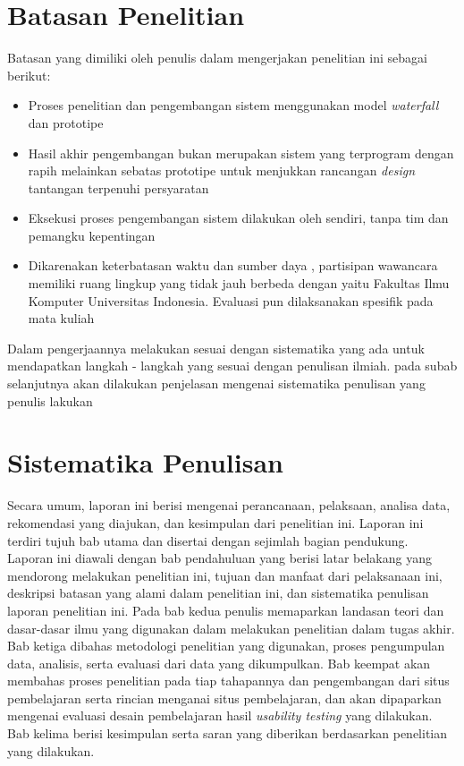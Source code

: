 \section{Batasan Penelitian}
Batasan yang dimiliki oleh penulis dalam mengerjakan penelitian ini sebagai berikut:
\begin{itemize}
	\item Proses penelitian dan pengembangan sistem menggunakan model \textit{waterfall} dan prototipe
	\item Hasil akhir pengembangan bukan merupakan sistem yang terprogram dengan rapih melainkan sebatas prototipe untuk menjukkan rancangan \textit{design} tantangan terpenuhi persyaratan
	\item Eksekusi proses pengembangan sistem dilakukan oleh \saya sendiri, tanpa tim dan pemangku kepentingan
	\item Dikarenakan keterbatasan waktu dan sumber daya \saya, partisipan wawancara memiliki ruang lingkup yang tidak jauh berbeda dengan \saya yaitu Fakultas Ilmu Komputer Universitas Indonesia. Evaluasi pun dilaksanakan spesifik pada mata kuliah \ddp
\end{itemize}
Dalam pengerjaannya \saya melakukan sesuai dengan sistematika yang ada untuk mendapatkan langkah - langkah yang sesuai dengan penulisan ilmiah. pada subab selanjutnya akan dilakukan penjelasan mengenai sistematika penulisan yang penulis lakukan
\section{Sistematika Penulisan}
Secara umum, laporan ini berisi mengenai perancanaan, pelaksaan, analisa data, rekomendasi yang diajukan, dan kesimpulan dari penelitian ini. Laporan ini terdiri tujuh bab utama dan disertai dengan sejimlah bagian pendukung. Laporan ini diawali dengan bab pendahuluan yang berisi latar belakang yang mendorong \saya melakukan penelitian ini, tujuan dan manfaat dari pelaksanaan ini, deskripsi batasan yang \saya alami dalam penelitian ini, dan sistematika penulisan laporan penelitian ini. Pada bab kedua penulis memaparkan landasan teori dan dasar-dasar ilmu yang
digunakan dalam melakukan penelitian dalam tugas akhir. Bab ketiga dibahas
metodologi penelitian yang digunakan, proses pengumpulan data, analisis, serta
evaluasi dari data yang dikumpulkan. Bab keempat akan membahas proses penelitian
pada tiap tahapannya dan pengembangan dari situs pembelajaran serta rincian
menganai situs pembelajaran, dan akan dipaparkan mengenai evaluasi desain pembelajaran hasil \textit{usability testing} yang dilakukan. Bab kelima berisi kesimpulan serta saran yang diberikan berdasarkan penelitian yang dilakukan.